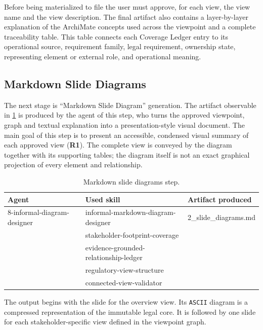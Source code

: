 Before being materialized to file the user must approve, for each view, the view name and the view description.
The final artifact also contains a layer-by-layer explanation of the ArchiMate concepts used across the viewpoint and a complete traceability table. This table connects each Coverage Ledger entry to its operational source, requirement family, legal requirement, ownership state, representing element or external role, and operational meaning.


\subsection{Markdown Slide Diagrams}

The next stage is ``Markdown Slide Diagram'' generation. The artifact observable in \ref{tab:markdown-slide-diagrams} is produced by the agent of this step, who turns the approved viewpoint, graph and textual explanation into a presentation-style visual document. The main goal of this step is to present an accessible, condensed visual summary of each approved view (\textbf{R1}). The complete view is conveyed by the diagram together with its supporting tables; the diagram itself is not an exact graphical projection of every element and relationship.

\begin{table}[b]
\centering
\small
\begin{tabular}{p{5.2cm} p{5.5cm} p{3.5cm}}
\hline
\textbf{Agent} & \textbf{Used skill} & \textbf{Artifact produced} \\
\hline
8-informal-diagram-designer &
informal-markdown-diagram-designer &
2\_slide\_diagrams.md \\
 &
stakeholder-footprint-coverage &
 \\
 &
evidence-grounded-relationship-ledger &
 \\
 &
regulatory-view-structure &
 \\
 &
connected-view-validator &
 \\
\hline
\end{tabular}
\caption{Markdown slide diagrams step.}
\label{tab:markdown-slide-diagrams}
\end{table}

The output begins with the slide for the overview view. Its \texttt{ASCII} diagram is a compressed representation of the immutable legal core. It is followed by one slide for each stakeholder-specific view defined in the viewpoint graph.

